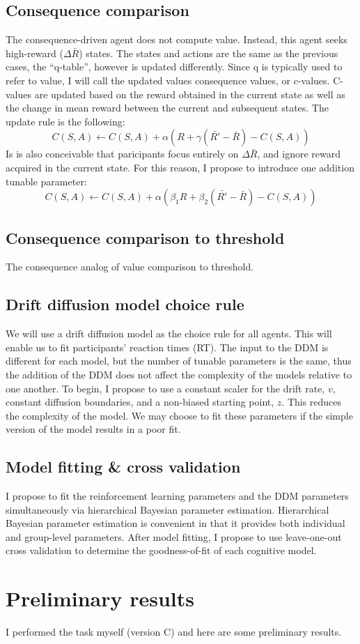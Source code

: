 \documentclass[11pt]{article}
\begin{document}
\subsection{Consequence comparison}
\label{sec:orgc9b943e}
The consequence-driven agent does not compute value. Instead, this agent seeks high-reward (\(\Delta\bar{R}\)) states.
The states and actions are the same as the previous cases, the ``q-table'', however is updated differently. Since q is typically used to refer to value, I will call the updated values consequence values, or c-values. C-values are updated based on the reward obtained in the current state as well as the change in mean reward between the current and subsequent states.
The update rule is the following:
\begin{equation}
C(S, A) \gets C(S, A) + \alpha (R + \gamma (\bar{R'} - \bar{R}) - C(S, A))
\end{equation}
Is is also conceivable that paricipants focus entirely on \(\Delta\bar{R}\), and ignore reward acquired in the current state. For this reason, I propose to introduce one addition tunable parameter:
\begin{equation}
C(S, A) \gets C(S, A) + \alpha (\beta_1 R + \beta_2 (\bar{R'} - \bar{R}) - C(S, A))
\end{equation}
\subsection{Consequence comparison to threshold}
\label{sec:orgc5b789e}
The consequence analog of value comparison to threshold.
\subsection{Drift diffusion model choice rule}
\label{sec:org5646890}
We will use a drift diffusion model as the choice rule for all agents. This will enable us to fit participants' reaction times (RT). The input to the DDM is different for each model, but the number of tunable parameters is the same, thus the addition of the DDM does not affect the complexity of the models relative to one another. To begin, I propose to use a constant scaler for the drift rate, \(v\), constant diffusion boundaries, and a non-biased starting point, \(z\). This reduces the complexity of the model. We may choose to fit these parameters if the simple version of the model results in a poor fit.
\subsection{Model fitting \& cross validation}
\label{sec:org744bcde}
I propose to fit the reinforcement learning parameters and the DDM parameters simultaneously via hierarchical Bayesian parameter estimation. Hierarchical Bayesian parameter estimation is convenient in that it provides both individual and group-level parameters.
After model fitting, I propose to use leave-one-out cross validation to determine the goodness-of-fit of each cognitive model.
\section{Preliminary results}
\label{sec:orgc623854}
I performed the task myself (version C) and here are some preliminary results.
\begin{center}

\end{center}
\end{document}
